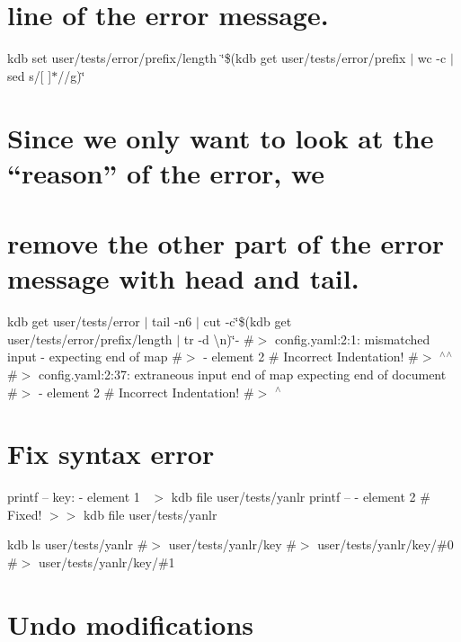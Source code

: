 \section*{line of the error message.}

kdb set user/tests/error/prefix/length \char`\"{}\$(kdb get user/tests/error/prefix $\vert$ wc -\/c $\vert$ sed \textquotesingle{}s/\mbox{[} \mbox{]}$\ast$//g\textquotesingle{})\char`\"{}

\section*{Since we only want to look at the “reason” of the error, we}

\section*{remove the other part of the error message with {\ttfamily head} and {\ttfamily tail}.}

kdb get user/tests/error $\vert$ tail -\/n6 $\vert$ cut -\/c\char`\"{}\$(kdb get user/tests/error/prefix/length $\vert$ tr -\/d \textquotesingle{}\textbackslash{}n\textquotesingle{})\char`\"{}-\/ \#$>$ config.\+yaml\+:2\+:1\+: mismatched input \textquotesingle{}-\/ \textquotesingle{} expecting end of map \#$>$ -\/ element 2 \# Incorrect Indentation! \#$>$ $^\wedge$$^\wedge$ \#$>$ config.\+yaml\+:2\+:37\+: extraneous input \textquotesingle{}end of map\textquotesingle{} expecting end of document \#$>$ -\/ element 2 \# Incorrect Indentation! \#$>$ $^\wedge$

\section*{Fix syntax error}

printf -- \textquotesingle{}key\+: -\/ element 1~\newline
\textquotesingle{} $>$ {\ttfamily kdb file user/tests/yanlr} printf -- \textquotesingle{} -\/ element 2 \# Fixed!\textquotesingle{} $>$$>$ {\ttfamily kdb file user/tests/yanlr}

kdb ls user/tests/yanlr \#$>$ user/tests/yanlr/key \#$>$ user/tests/yanlr/key/\#0 \#$>$ user/tests/yanlr/key/\#1

\section*{Undo modifications}


